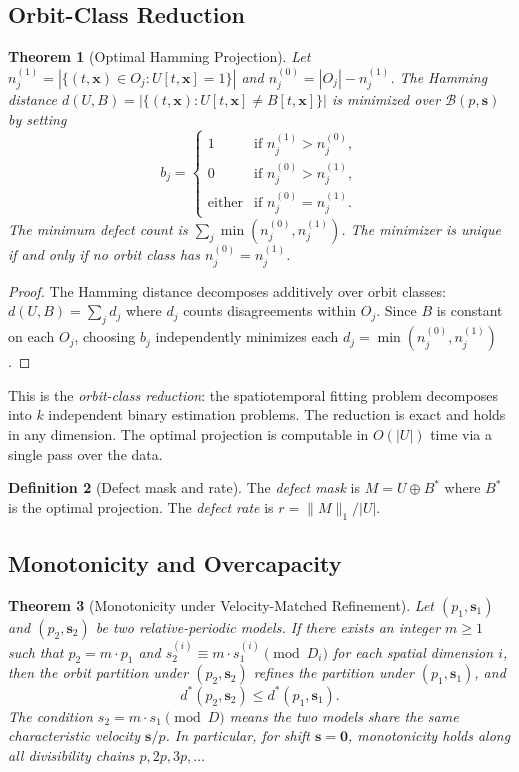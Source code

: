 \documentclass[11pt]{article}
\newtheorem{theorem}{Theorem}
\theoremstyle{definition}
\newtheorem{definition}[theorem]{Definition}
\theoremstyle{remark}
\newcommand{\bs}{\mathbf{s}}
\newcommand{\bx}{\mathbf{x}}
\begin{document}
\subsection{Orbit-Class Reduction}

\begin{theorem}[Optimal Hamming Projection]\label{thm:projection}
Let $n_j^{(1)} = |\{(t,\bx) \in O_j : U[t,\bx] = 1\}|$ and $n_j^{(0)} = |O_j| - n_j^{(1)}$.
The Hamming distance $d(U, B) = |\{(t,\bx) : U[t,\bx] \neq B[t,\bx]\}|$ is minimized over $\mathcal{B}(p, \bs)$ by setting
\[
b_j = \begin{cases}
1 & \text{if } n_j^{(1)} > n_j^{(0)}, \\
0 & \text{if } n_j^{(0)} > n_j^{(1)}, \\
\text{either} & \text{if } n_j^{(0)} = n_j^{(1)}.
\end{cases}
\]
The minimum defect count is $\sum_j \min(n_j^{(0)}, n_j^{(1)})$.
The minimizer is unique if and only if no orbit class has $n_j^{(0)} = n_j^{(1)}$.
\end{theorem}

\begin{proof}
The Hamming distance decomposes additively over orbit classes: $d(U,B) = \sum_j d_j$ where $d_j$ counts disagreements within $O_j$.
Since $B$ is constant on each $O_j$, choosing $b_j$ independently minimizes each $d_j = \min(n_j^{(0)}, n_j^{(1)})$.
\end{proof}

This is the \emph{orbit-class reduction}: the spatiotemporal fitting problem decomposes into $k$ independent binary estimation problems.
The reduction is exact and holds in any dimension.
The optimal projection is computable in $O(|U|)$ time via a single pass over the data.

\begin{definition}[Defect mask and rate]\label{def:defect}
The \emph{defect mask} is $M = U \oplus B^*$ where $B^*$ is the optimal projection.
The \emph{defect rate} is $r = \|M\|_1 / |U|$.
\end{definition}

\subsection{Monotonicity and Overcapacity}

\begin{theorem}[Monotonicity under Velocity-Matched Refinement]\label{thm:monotonicity}
Let $(p_1, \bs_1)$ and $(p_2, \bs_2)$ be two relative-periodic models.
If there exists an integer $m \geq 1$ such that $p_2 = m \cdot p_1$ and $s_2^{(i)} \equiv m \cdot s_1^{(i)} \pmod{D_i}$ for each spatial dimension $i$, then the orbit partition under $(p_2, \bs_2)$ refines the partition under $(p_1, \bs_1)$, and
\[
d^*(p_2, \bs_2) \leq d^*(p_1, \bs_1).
\]
The condition $s_2 = m \cdot s_1 \pmod{D}$ means the two models share the same \emph{characteristic velocity} $\bs/p$.
In particular, for shift $\bs = \mathbf{0}$, monotonicity holds along all divisibility chains $p, 2p, 3p, \ldots$
\end{theorem}
\end{document}
